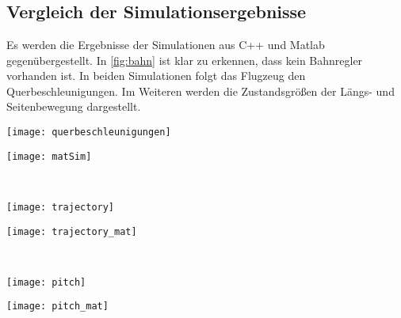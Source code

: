 \appendix 
\chapter{}
\section{Vergleich der Simulationsergebnisse}
Es werden die Ergebnisse der Simulationen aus C++ und Matlab gegenübergestellt. In \ref{fig:bahn} ist klar zu erkennen, dass kein Bahnregler vorhanden ist. In beiden Simulationen folgt das Flugzeug den Querbeschleunigungen. Im Weiteren werden die Zustandsgrößen der Längs- und Seitenbewegung dargestellt.\\
\label{sec:simerg}
 \begin{minipage}{0.49\linewidth} 	
	\texttt{[image: querbeschleunigungen]}
\end{minipage}
\begin{minipage}{0.01\linewidth}
	\hfill
\end{minipage}
\begin{minipage}{0.49\linewidth}
	\texttt{[image: matSim]}
\end{minipage}
\noindent\\
%
%
 \begin{minipage}{0.49\linewidth} 	
	\texttt{[image: trajectory]}
\end{minipage}
\begin{minipage}{0.01\linewidth}
	\hfill
\end{minipage}
\begin{minipage}{0.49\linewidth}
	\texttt{[image: trajectory\_mat]}
\end{minipage}
\label{fig:bahn}\noindent\\
%
%
 \begin{minipage}{0.49\linewidth} 	
	\texttt{[image: pitch]}
\end{minipage}
\begin{minipage}{0.01\linewidth}
	\hfill
\end{minipage}
\begin{minipage}{0.49\linewidth}
	\texttt{[image: pitch\_mat]}
\end{minipage}
\noindent\\
